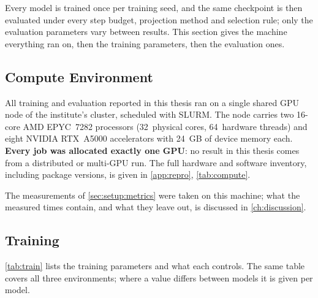Every model is trained once per training seed, and the same checkpoint is then evaluated under every step
budget, projection method and selection rule; only the evaluation parameters vary between results. This
section gives the machine everything ran on, then the training parameters, then the evaluation ones.

\subsection{Compute Environment}\label{sec:setup:protocol:compute}

All training and evaluation reported in this thesis ran on a single shared GPU node of the
institute's cluster, scheduled with SLURM. The node carries two 16-core AMD EPYC~7282 processors
(32~physical cores, 64~hardware threads) and eight NVIDIA RTX~A5000 accelerators with 24~GB of
device memory each. \textbf{Every job was allocated exactly one GPU}: no result in this thesis comes
from a distributed or multi-GPU run. The full hardware and software inventory, including package
versions, is given in \autoref{app:repro}, \autoref{tab:compute}.

The measurements of \autoref{sec:setup:metrics} were taken on this machine; what the measured times
contain, and what they leave out, is discussed in \autoref{ch:discussion}.

\subsection{Training}\label{sec:setup:protocol:training}

\autoref{tab:train} lists the training parameters and what each controls. The same table covers all three
environments; where a value differs between models it is given per model.

